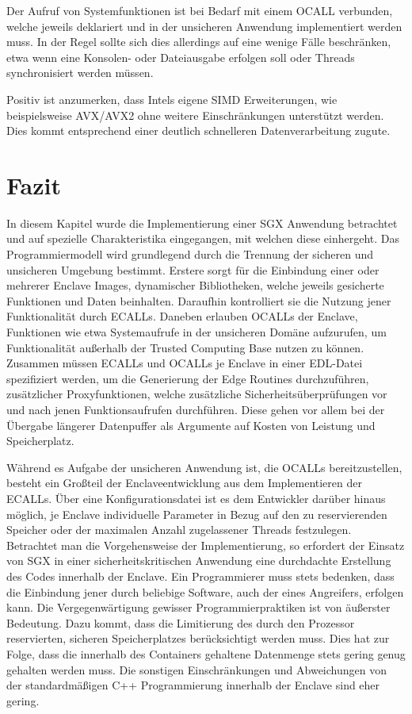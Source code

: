 Der Aufruf von Systemfunktionen ist bei Bedarf mit einem OCALL verbunden, welche jeweils deklariert und in der unsicheren Anwendung implementiert werden muss. In der Regel sollte sich dies allerdings auf eine wenige Fälle beschränken, etwa wenn eine Konsolen- oder Dateiausgabe erfolgen soll oder Threads synchronisiert werden müssen.

Positiv ist anzumerken, dass Intels eigene SIMD Erweiterungen, wie beispielsweise AVX/AVX2 ohne weitere Einschränkungen unterstützt werden. Dies kommt entsprechend einer deutlich schnelleren Datenverarbeitung zugute.

\section{Fazit}

In diesem Kapitel wurde die Implementierung einer SGX Anwendung betrachtet und auf spezielle Charakteristika eingegangen, mit welchen diese einhergeht. Das Programmiermodell wird grundlegend durch die Trennung der sicheren und unsicheren Umgebung bestimmt. Erstere sorgt für die Einbindung einer oder mehrerer Enclave Images, dynamischer Bibliotheken, welche jeweils gesicherte Funktionen und Daten beinhalten. Daraufhin kontrolliert sie die Nutzung jener Funktionalität durch ECALLs. Daneben erlauben OCALLs der Enclave, Funktionen wie etwa Systemaufrufe in der unsicheren Domäne aufzurufen, um Funktionalität außerhalb der Trusted Computing Base nutzen zu können. Zusammen müssen ECALLs und OCALLs je Enclave in einer EDL-Datei spezifiziert werden, um die Generierung der Edge Routines durchzuführen, zusätzlicher Proxyfunktionen, welche zusätzliche Sicherheitsüberprüfungen vor und nach jenen Funktionsaufrufen durchführen. Diese gehen vor allem bei der Übergabe längerer Datenpuffer als Argumente auf Kosten von Leistung und Speicherplatz.

Während es Aufgabe der unsicheren Anwendung ist, die OCALLs bereitzustellen, besteht ein Großteil der Enclaveentwicklung aus dem Implementieren der ECALLs. Über eine Konfigurationsdatei ist es dem Entwickler darüber hinaus möglich, je Enclave individuelle Parameter in Bezug auf den zu reservierenden Speicher oder der maximalen Anzahl zugelassener Threads festzulegen. Betrachtet man die Vorgehensweise der Implementierung, so erfordert der Einsatz von SGX in einer sicherheitskritischen Anwendung eine durchdachte Erstellung des Codes innerhalb der Enclave. Ein Programmierer muss stets bedenken, dass die Einbindung jener durch beliebige Software, auch der eines Angreifers, erfolgen kann. Die Vergegenwärtigung gewisser Programmierpraktiken ist von äußerster Bedeutung. Dazu kommt, dass die Limitierung des durch den Prozessor reservierten, sicheren Speicherplatzes berücksichtigt werden muss. Dies hat zur Folge, dass die innerhalb des Containers gehaltene Datenmenge stets gering genug gehalten werden muss. Die sonstigen Einschränkungen und Abweichungen von der standardmäßigen C++ Programmierung innerhalb der Enclave sind eher gering.